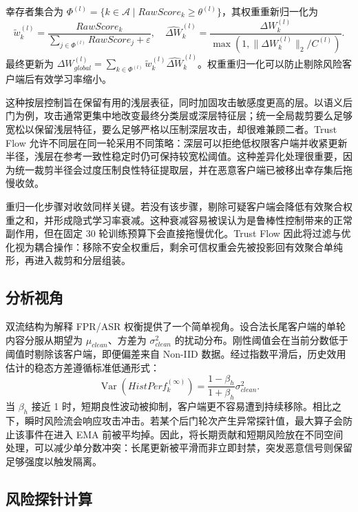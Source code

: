 \documentclass[10pt,a4paper,UTF8,fontset=fandol]{ctexart}
\begin{document}
幸存者集合为 $\Phi^{(l)}=\{k\in\mathcal{A}\mid RawScore_k\ge\theta^{(l)}\}$，其权重重新归一化为
\begin{equation}
    \tilde{w}_{k}^{(l)}=\frac{RawScore_k}{\sum_{j\in\Phi^{(l)}}RawScore_j+\varepsilon},\quad
    \widehat{\Delta W}_k^{(l)}=\frac{\Delta W_k^{(l)}}{\max(1,\|\Delta W_k^{(l)}\|_2/C^{(l)})}.
\end{equation}
最终更新为 $\Delta W_{global}^{(l)}=\sum_{k\in\Phi^{(l)}}\tilde{w}_{k}^{(l)}\widehat{\Delta W}_k^{(l)}$。权重重归一化可以防止剔除风险客户端后有效学习率缩小。

这种按层控制旨在保留有用的浅层表征，同时加固攻击敏感度更高的层。以语义后门为例，攻击通常更集中地改变最终分类层或深层特征层；统一全局裁剪要么足够宽松以保留浅层特征，要么足够严格以压制深层攻击，却很难兼顾二者。Trust Flow 允许不同层在同一轮采用不同策略：深层可以拒绝低权限客户端并收紧更新半径，浅层在参考一致性稳定时仍可保持较宽松阈值。这种差异化处理很重要，因为统一裁剪半径会过度压制良性特征提取层，并在恶意客户端已被移出幸存集后拖慢收敛。

重归一化步骤对收敛同样关键。若没有该步骤，剔除可疑客户端会降低有效聚合权重之和，并形成隐式学习率衰减。这种衰减容易被误认为是鲁棒性控制带来的正常副作用，但在固定 30 轮训练预算下会直接拖慢优化。Trust Flow 因此将过滤与优化视为耦合操作：移除不安全权重后，剩余可信权重会先被投影回有效聚合单纯形，再进入裁剪和分层组装。

\subsection{分析视角}

双流结构为解释 FPR/ASR 权衡提供了一个简单视角。设合法长尾客户端的单轮内容分服从期望为 $\mu_{clean}$、方差为 $\sigma_{clean}^2$ 的扰动分布。刚性阈值会在当前分数低于阈值时剔除该客户端，即便偏差来自 Non-IID 数据。经过指数平滑后，历史效用估计的稳态方差遵循标准低通形式：
\begin{equation}
    \operatorname{Var}(HistPerf_k^{(\infty)})=\frac{1-\beta_h}{1+\beta_h}\sigma_{clean}^2 .
\end{equation}
当 $\beta_h$ 接近 1 时，短期良性波动被抑制，客户端更不容易遭到持续移除。相比之下，瞬时风险流会响应攻击冲击。若某个后门轮次产生异常探针值，最大算子会防止该事件在进入 EMA 前被平均掉。因此，将长期贡献和短期风险放在不同空间处理，可以减少单分数冲突：长尾更新被平滑而非立即封禁，突发恶意信号则保留足够强度以触发隔离。

\subsection{风险探针计算}
\end{document}

